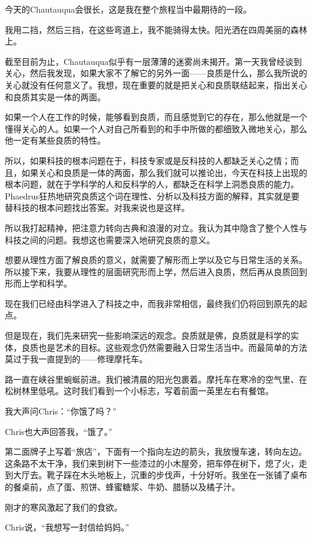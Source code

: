 \documentclass[UTF8]{article}
\begin{document}
\par 今天的Chautauqua会很长，这是我在整个旅程当中最期待的一段。
\par 我用二挡，然后三挡，在这些弯道上，我不能骑得太快。阳光洒在四周美丽的森林上。
\par 截至目前为止，Chautauqua似乎有一层薄薄的迷雾尚未揭开。第一天我曾经谈到关心，然后我发现，如果大家不了解它的另外一面——良质是什么，那么我所说的关心就没有任何意义了。我想，现在重要的就是把关心和良质联结起来，指出关心和良质其实是一体的两面。
\par 如果一个人在工作的时候，能够看到良质，而且感觉到它的存在，那么他就是一个懂得关心的人。如果一个人对自己所看到的和手中所做的都细致入微地关心，那么他一定有某些良质的特性。
\par 所以，如果科技的根本问题在于，科技专家或是反科技的人都缺乏关心之情；而且，如果关心和良质是一体的两面，那么我们就可以推论出，今天在科技上出现的根本问题，就在于学科学的人和反科学的人，都缺乏在科学上洞悉良质的能力。Phaedrus狂热地研究良质这个词在理性、分析以及科技方面的解释，其实就是要替科技的根本问题找出答案。对我来说也是这样。
\par 所以我打起精神，把注意力转向古典和浪漫的对立。我认为其中隐含了整个人性与科技之间的问题。我想这也需要深入地研究良质的意义。
\par 想要从理性方面了解良质的意义，就需要了解形而上学以及它与日常生活的关系。所以接下来，我要从理性的层面研究形而上学，然后进入良质，然后再从良质回到形而上学和科学。
\par 现在我们已经由科学进入了科技之中，而我非常相信，最终我们仍将回到原先的起点。
\par 但是现在，我们先来研究一些影响深远的观念。良质就是佛，良质就是科学的实体，良质也是艺术的目标。这些观念仍然需要融入日常生活当中。而最简单的方法莫过于我一直提到的——修理摩托车。
\par 路一直在峡谷里蜿蜒前进。我们被清晨的阳光包裹着。摩托车在寒冷的空气里、在松树林里低吼。这时我们看到一个小标志，写着前面一英里左右有餐馆。
\par 我大声问Chris：“你饿了吗？”
\par Chris也大声回答我，“饿了。”
\par 第二面牌子上写着“旅店”，下面有一个指向左边的箭头，我放慢车速，转向左边。这条路不太干净，我们来到树下一些漆过的小木屋旁，把车停在树下，熄了火，走到大厅去。靴子踩在木头地板上，沉重的步伐声，十分好听。我坐在一张铺了桌布的餐桌前，点了蛋、煎饼、蜂蜜糖浆、牛奶、腊肠以及橘子汁。
\par 刚才的寒风激起了我们的食欲。
\par Chris说，“我想写一封信给妈妈。”
\end{document}
